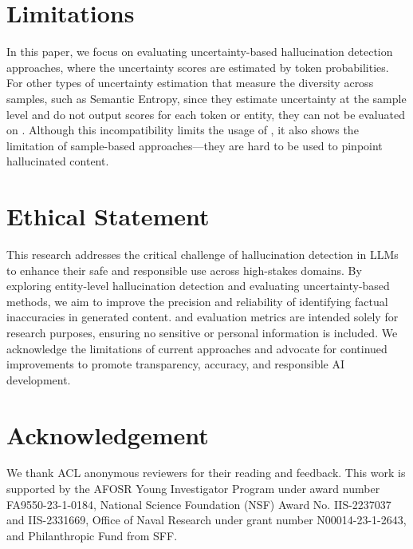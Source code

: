 \section*{Limitations}

In this paper, we focus on evaluating uncertainty-based hallucination detection approaches, where the uncertainty scores are estimated by token probabilities. For other types of uncertainty estimation that measure the diversity across samples, such as Semantic Entropy, since they estimate uncertainty at the sample level and do not output scores for each token or entity, they can not be evaluated on \dataset. Although this incompatibility limits the usage of \dataset, it also shows the limitation of sample-based approaches---they are hard to be used to pinpoint hallucinated content.


\section*{Ethical Statement}

This research addresses the critical challenge of hallucination detection in LLMs to enhance their safe and responsible use across high-stakes domains. By exploring entity-level hallucination detection and evaluating uncertainty-based methods, we aim to improve the precision and reliability of identifying factual inaccuracies in generated content. \dataset and evaluation metrics are intended solely for research purposes, ensuring no sensitive or personal information is included. We acknowledge the limitations of current approaches and advocate for continued improvements to promote transparency, accuracy, and responsible AI development.

\section*{Acknowledgement}
We thank ACL anonymous reviewers for their reading and feedback. This work is supported by the AFOSR Young Investigator Program under award number FA9550-23-1-0184, National Science Foundation (NSF) Award No. IIS-2237037 and IIS-2331669, Office of Naval Research under grant number N00014-23-1-2643, and Philanthropic Fund from SFF.